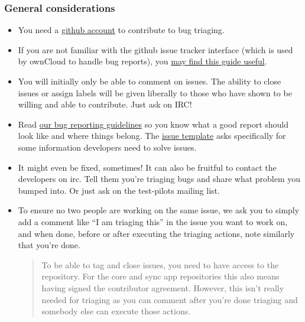 \documentclass[letterpaper,10pt,english]{sphinxmanual}
\begin{document}
\subsubsection{General considerations}
\label{bugtracker/triaging:general-considerations}\begin{itemize}
\item {} 
You need a \href{https://github.com}{github account} to contribute to bug triaging.

\item {} 
If you are not familiar with the github issue tracker interface (which is used by ownCloud to handle bug reports), you \href{https://guides.github.com/features/issues/}{may find this guide useful}.

\item {} 
You will initially only be able to comment on issues. The ability to close issues or assign labels will be given liberally to those who have shown to be willing and able to contribute. Just ask on IRC!

\item {} 
Read \href{https://github.com/owncloud/core/blob/master/.github/CONTRIBUTING.md\#submitting-issues}{our bug reporting guidelines} so you know what a good report should look like and where things belong. The \href{https://raw.github.com/owncloud/core/master/.github/issue\_template.md}{issue template} asks specifically for some information developers need to solve issues.

\item {} 
It might even be fixed, sometimes! It can also be fruitful to contact the developers on irc. Tell them you're triaging bugs and share what problem you bumped into. Or just ask on the test-pilots mailing list.

\item {} 
To ensure no two people are working on the same issue, we ask you to simply add a comment like ``I am triaging this'' in the issue you want to work on, and when done, before or after executing the triaging actions, note similarly that you're done.
\begin{quote}

To be able to tag and close issues, you need to have access to the repository. For the core and sync app repositories this also means having signed the contributor agreement. However, this isn't really needed for triaging as you can comment after you're done triaging and somebody else can execute those actions.
\end{quote}

\end{itemize}
\end{document}
